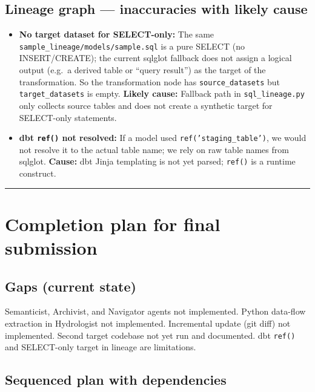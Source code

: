 \documentclass[11pt,a4paper]{article}
\begin{document}
\subsection{Lineage graph — inaccuracies with likely cause}

\begin{itemize}
  \item \textbf{No target dataset for SELECT-only:} The same \texttt{sample\_lineage/models/sample.sql} is a pure SELECT (no INSERT/CREATE); the current sqlglot fallback does not assign a logical output (e.g.\ a derived table or ``query result'') as the target of the transformation. So the transformation node has \texttt{source\_datasets} but \texttt{target\_datasets} is empty. \textbf{Likely cause:} Fallback path in \texttt{sql\_lineage.py} only collects source tables and does not create a synthetic target for SELECT-only statements.
  \item \textbf{dbt \texttt{ref()} not resolved:} If a model used \texttt{ref('staging\_table')}, we would not resolve it to the actual table name; we rely on raw table names from sqlglot. \textbf{Cause:} dbt Jinja templating is not yet parsed; \texttt{ref()} is a runtime construct.
\end{itemize}

\vspace{1em}
\hrule
\vspace{1em}

\section{Completion plan for final submission}

\subsection{Gaps (current state)}

Semanticist, Archivist, and Navigator agents not implemented. Python data-flow extraction in Hydrologist not implemented. Incremental update (git diff) not implemented. Second target codebase not yet run and documented. dbt \texttt{ref()} and SELECT-only target in lineage are limitations.

\subsection{Sequenced plan with dependencies}
\end{document}
